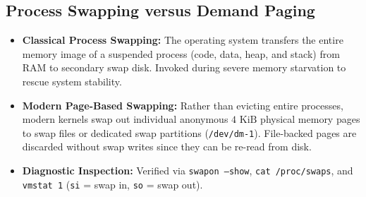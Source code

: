 \subsection{Process Swapping versus Demand Paging}
\begin{itemize}
    \item \textbf{Classical Process Swapping:} The operating system transfers the entire memory image of a suspended process (code, data, heap, and stack) from RAM to secondary swap disk. Invoked during severe memory starvation to rescue system stability.
    \item \textbf{Modern Page-Based Swapping:} Rather than evicting entire processes, modern kernels swap out individual anonymous $4\text{ KiB}$ physical memory pages to swap files or dedicated swap partitions (\texttt{/dev/dm-1}). File-backed pages are discarded without swap writes since they can be re-read from disk.
    \item \textbf{Diagnostic Inspection:} Verified via \texttt{swapon --show}, \texttt{cat /proc/swaps}, and \texttt{vmstat 1} (\texttt{si} = swap in, \texttt{so} = swap out).
\end{itemize}

